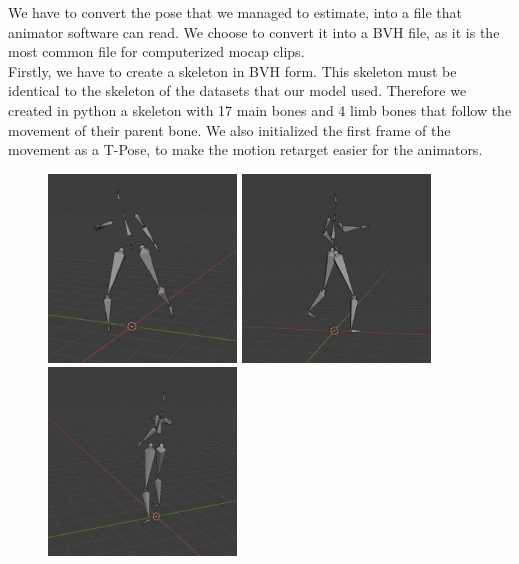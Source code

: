 We have to convert the pose that we managed to estimate, into a file that animator software can read. We choose to convert it into a BVH file, as it is the most common file for computerized mocap clips. \\

Firstly, we have to create a skeleton in BVH form. This skeleton must be identical to the skeleton of the datasets that our model used. Therefore we created in python a skeleton with 17 main bones and 4 limb bones that follow the movement of their parent bone. We also initialized the first frame of the movement as a T-Pose, to make the motion retarget easier for the animators.\\

\pagebreak

\begin{figure}[htp]
    \centering
    \includegraphics[width=5cm]{figures/Implementation/skeleton1.png}%
    \qquad
    \includegraphics[width=5cm]{figures/Implementation/skeleton2.png}%
    \qquad
    \includegraphics[width=5cm]{figures/Implementation/skeleton3.png}%

\end{figure}
